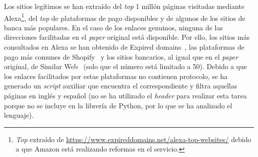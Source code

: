 Los sitios legítimos se han extraído del \textit{top} 1 millón páginas visitadas mediante Alexa\footnote{\textit{Top} extraído de \url{https://www.expireddomains.net/alexa-top-websites/} debido a que Amazon está realizando reformas en el servicio.}, del \textit{top} de plataformas de pago disponibles y de algunos de los sitios de banca más populares. En el caso de los enlaces genuinos, ninguna de las direcciones facilitadas en el \textit{paper} original está disponible. Por ello, los sitios más consultados en Alexa se han obtenido de Expired domains~\cite{AlexaTopWebsites}, las plataformas de pago más comunes de Shopify~\cite{paymentGatewaysWebsites} y los sitios bancarios, al igual que en el \textit{paper} original, de Similar Web~\cite{banksitesTop} (solo que el número está limitado a 50). Debido a que los enlaces facilitados por estas plataformas no contienen protocolo, se ha generado un \textit{script} auxiliar que encuentra el correspondiente y filtra aquellas páginas en inglés y español (no se ha utilizado el \textit{header} para realizar esta tarea porque no se incluye en la librería de Python, por lo que se ha analizado el lenguaje).




